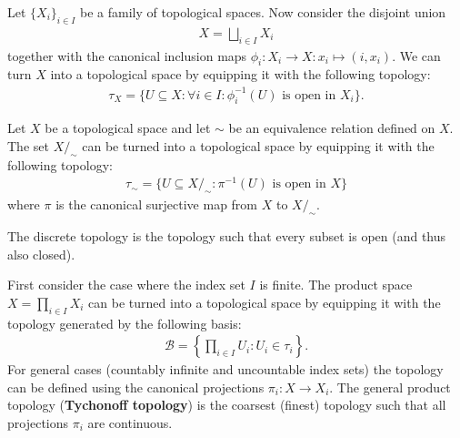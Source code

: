     \begin{example}\label{topology:disjoint_union}
        Let $\{X_i\}_{i\in I}$ be a family of topological spaces. Now consider the disjoint union
        \begin{gather}
            X = \bigsqcup_{i\in I} X_i
        \end{gather}
        together with the canonical inclusion maps $\phi_i:X_i\rightarrow X:x_i\mapsto(i, x_i)$. We can turn $X$ into a topological space by equipping it with the following topology:
        \begin{gather}
            \tau_X = \big\{U\subseteq X:\forall i\in I:\phi_i^{-1}(U)\text{ is open in }X_i\big\}.
        \end{gather}
    \end{example}

    \begin{example}
        Let $X$ be a topological space and let $\sim$ be an equivalence relation defined on $X$. The set $X/_\sim$ can be turned into a topological space by equipping it with the following topology:
        \begin{gather}
            \label{topology:quotient_space}
            \tau_\sim = \big\{U\subseteq X/_\sim:\pi^{-1}(U)\text{ is open in }X\big\}
        \end{gather}
        where $\pi$ is the canonical surjective map from $X$ to $X/_\sim$.
    \end{example}

    \begin{example}
        The discrete topology is the topology such that every subset is open (and thus also closed).
    \end{example}

    \begin{example}\label{topology:tychonoff_topology}
        First consider the case where the index set $I$ is finite. The product space $X = \prod_{i\in I}X_i$ can be turned into a topological space by equipping it with the topology generated by the following basis:
        \begin{gather}
            \mathcal{B} = \left\{\prod_{i\in I}U_i:U_i\in\tau_i\right\}.
        \end{gather}
        For general cases (countably infinite and uncountable index sets) the topology can be defined using the canonical projections $\pi_i:X\rightarrow X_i$. The general product topology (\textbf{Tychonoff topology}) is the coarsest (finest) topology such that all projections $\pi_i$ are continuous.
    \end{example}

